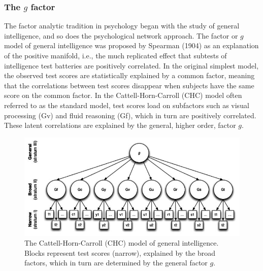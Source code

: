 \documentclass[
  a4paper,
  DIV=11,
  numbers=noendperiod,
  oneside]{scrreprt}
\begin{document}
\hypertarget{sec-The-g-factor}{%
\subsubsection{\texorpdfstring{The \(g\)
factor}{The g factor}}\label{sec-The-g-factor}}

The factor analytic tradition in psychology began with the study of
general intelligence, and so does the psychological network approach.
The factor or \(g\) model of general intelligence was proposed by
Spearman (1904) as an explanation of the positive manifold, i.e., the
much replicated effect that subtests of intelligence test batteries are
positively correlated. In the original simplest model, the observed test
scores are statistically explained by a common factor, meaning that the
correlations between test scores disappear when subjects have the same
score on the common factor. In the Cattell-Horn-Carroll (CHC) model
often referred to as the standard model, test scores load on subfactors
such as visual processing (Gv) and fluid reasoning (Gf), which in turn
are positively correlated. These latent correlations are explained by
the general, higher order, factor \(g\).

\begin{figure}

{\centering \includegraphics{media/ch6/image4.jpg}

}

\caption{\label{fig-ch6-img4-old-73}The Cattell-Horn-Carroll (CHC) model
of general intelligence. Blocks represent test scores (narrow),
explained by the broad factors, which in turn are determined by the
general factor \(g\).}

\end{figure}
\end{document}
